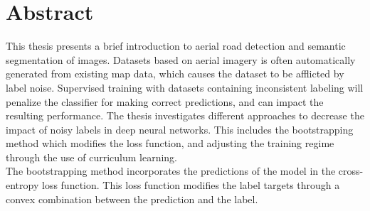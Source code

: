 \documentclass[a4paper]{book}
\newcommand{\thesisAuthor}{Olav Kåre Vatne}
\newcommand{\thesisTitle}{Detecting roads in aerial imagery}
\newcommand{\thesisType}{master project}
\newcommand{\thesisDate}{spring 2016}
\begin{document}







\frontmatter

\clearpage

\section*{Abstract}
This thesis presents a brief introduction to aerial road detection and semantic segmentation of images. Datasets based on aerial imagery is often automatically generated from existing map data, which causes the dataset to be afflicted by label noise. Supervised training with datasets containing inconsistent labeling will penalize the classifier for making correct predictions, and can impact the resulting performance. The thesis investigates different approaches to decrease the impact of noisy labels in deep neural networks. This includes the bootstrapping method which modifies the loss function, and adjusting the training regime through the use of curriculum learning.\\

The bootstrapping method incorporates the predictions of the model in the cross-entropy loss function. This loss function modifies the label targets through a convex combination between the prediction and the label.\\
\end{document}

